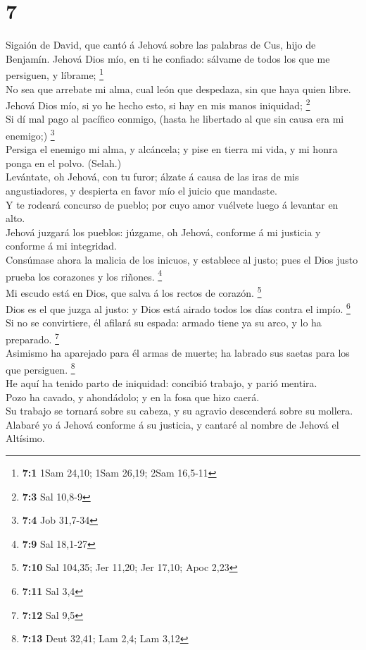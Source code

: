 \hypertarget{section-6}{%
\section{7}\label{section-6}}

 Sigaión de David, que cantó á Jehová sobre las palabras de
Cus, hijo de Benjamín. Jehová Dios mío, en ti he confiado: sálvame de
todos los que me persiguen, y líbrame; \footnote{\textbf{7:1} 1Sam
  24,10; 1Sam 26,19; 2Sam 16,5-11}\\
 No sea que arrebate mi alma, cual león que despedaza, sin
que haya quien libre.\\
 Jehová Dios mío, si yo he hecho esto, si hay en mis manos
iniquidad; \footnote{\textbf{7:3} Sal 10,8-9}\\
 Si dí mal pago al pacífico conmigo, (hasta he libertado al
que sin causa era mi enemigo;) \footnote{\textbf{7:4} Job 31,7-34}\\
 Persiga el enemigo mi alma, y alcáncela; y pise en tierra
mi vida, y mi honra ponga en el polvo. (Selah.)\\
 Levántate, oh Jehová, con tu furor; álzate á causa de las
iras de mis angustiadores, y despierta en favor mío el juicio que
mandaste.\\
 Y te rodeará concurso de pueblo; por cuyo amor vuélvete
luego á levantar en alto.\\
 Jehová juzgará los pueblos: júzgame, oh Jehová, conforme á
mi justicia y conforme á mi integridad.\\
 Consúmase ahora la malicia de los inicuos, y establece al
justo; pues el Dios justo prueba los corazones y los riñones.
\footnote{\textbf{7:9} Sal 18,1-27}\\
 Mi escudo está en Dios, que salva á los rectos de corazón.
\footnote{\textbf{7:10} Sal 104,35; Jer 11,20; Jer 17,10; Apoc 2,23}\\
 Dios es el que juzga al justo: y Dios está airado todos
los días contra el impío. \footnote{\textbf{7:11} Sal 3,4}\\
 Si no se convirtiere, él afilará su espada: armado tiene
ya su arco, y lo ha preparado. \footnote{\textbf{7:12} Sal 9,5}\\
 Asimismo ha aparejado para él armas de muerte; ha labrado
sus saetas para los que persiguen. \footnote{\textbf{7:13} Deut 32,41;
  Lam 2,4; Lam 3,12}\\
 He aquí ha tenido parto de iniquidad: concibió trabajo, y
parió mentira.\\
 Pozo ha cavado, y ahondádolo; y en la fosa que hizo
caerá.\\
 Su trabajo se tornará sobre su cabeza, y su agravio
descenderá sobre su mollera.\\
 Alabaré yo á Jehová conforme á su justicia, y cantaré al
nombre de Jehová el Altísimo.

